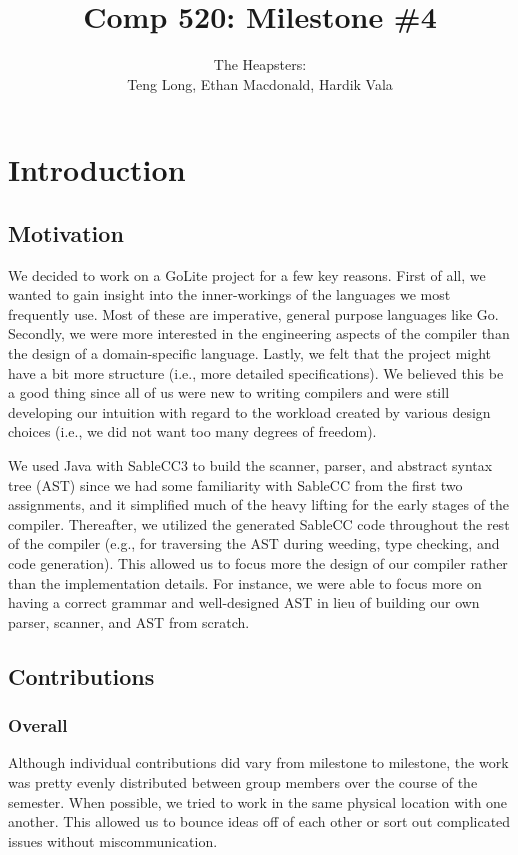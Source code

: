 \documentclass{article}
\title{Comp 520: Milestone \#4}
\author{The Heapsters: \\Teng Long, Ethan Macdonald, Hardik Vala}
\date{}
\begin{document}
\maketitle

\section{Introduction}

\subsection{Motivation}
We decided to work on a GoLite project for a few key reasons. First of all, we wanted to gain insight into the inner-workings of the languages we most frequently use. Most of these are imperative, general purpose languages like Go. Secondly, we were more interested in the engineering aspects of the compiler than the design of a domain-specific language. Lastly, we felt that the project might have a bit more structure (i.e., more detailed specifications). We believed this be a good thing since all of us were new to writing compilers and were still developing our intuition with regard to the workload created by various design choices (i.e., we did not want too many degrees of freedom).

We used Java with SableCC3 to build the scanner, parser, and abstract syntax tree (AST) since we had some familiarity with SableCC from the first two assignments, and it simplified much of the heavy lifting for the early stages of the compiler. Thereafter, we utilized the generated SableCC code throughout the rest of the compiler (e.g., for traversing the AST during weeding, type checking, and code generation). This allowed us to focus more the design of our compiler rather than the implementation details. For instance, we were able to focus more on having a correct grammar and well-designed AST in lieu of building our own parser, scanner, and AST from scratch. 

\subsection{Contributions}
\subsubsection{Overall}
Although individual contributions did vary from milestone to milestone, the work was pretty evenly distributed between group members over the course of the semester. When possible, we tried to work in the same physical location with one another. This allowed us to bounce ideas off of each other or sort out complicated issues without miscommunication.
\end{document}
